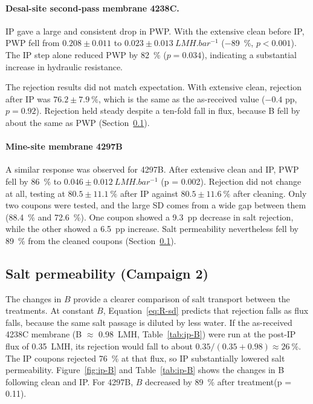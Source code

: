 \paragraph{Desal-site second-pass membrane 4238C.}
IP gave a large and consistent drop in PWP. With the extensive clean before IP, PWP fell from $0.208 \pm 0.011$ to $0.023 \pm \qty{0.013}{LMH.bar^{-1}}$ (\qty{-89}{\percent}, $p < 0.001$). The IP step alone reduced PWP by \qty{82}{\percent} ($p = 0.034$), indicating a substantial increase in hydraulic resistance. 

The rejection results did not match expectation. With extensive clean, rejection after IP was $76.2 \pm \qty{7.9}{\percent}$, which is the same as the as-received value ($-0.4$ pp, $p =0.92$). Rejection held steady despite a ten-fold fall in flux, because B fell by about the same as PWP (Section~\ref{sec:res-ip-B}).

\paragraph{Mine-site membrane 4297B}
A similar response was observed for 4297B. After extensive clean and IP, PWP fell by \qty{86}{\percent} to $0.046 \pm \qty{0.012}{LMH.bar^{-1}}$ (p = 0.002). Rejection did not change at all, testing at $80.5 \pm \qty{11.1}{\percent}$ after IP against $80.5 \pm \qty{11.6}{\percent}$ after cleaning. Only two coupons were tested, and the large SD comes from a wide gap between them (\qty{88.4}{\percent} and \qty{72.6}{\percent}). One coupon showed a  \qty{9.3}{pp} decrease in salt rejection, while the other showed a \qty{6.5}{pp} increase. Salt permeability nevertheless fell by \qty{89}{\percent} from the cleaned coupons (Section~\ref{sec:res-ip-B}).



\subsection{Salt permeability (Campaign 2)}
\label{sec:res-ip-B}
The changes in $B$ provide a clearer comparison of salt transport between the treatments. At constant $B$, Equation~\ref{eq:R-sd} predicts that rejection falls as flux falls, because the same salt passage is diluted by less water. If the as-received 4238C membrane (B $\approx$ \qty{0.98}{LMH}, Table~\ref{tab:ip-B}) were run at the post-IP flux of \qty{0.35}{LMH}, its rejection would fall to about $0.35/(0.35+0.98)\approx\qty{26}{\percent}$. The IP coupons rejected \qty{76}{\percent} at that flux, so IP substantially lowered salt permeability. Figure~\ref{fig:ip-B} and Table~\ref{tab:ip-B} shows the changes in B following clean and IP. For 4297B, $B$ decreased by \qty{89}{\percent} after treatment(p = 0.11).


